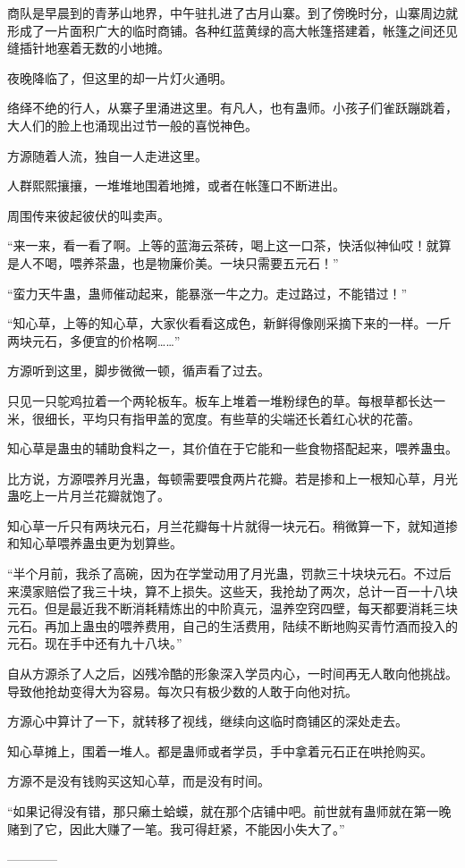 \begin{this_body}
商队是早晨到的青茅山地界，中午驻扎进了古月山寨。到了傍晚时分，山寨周边就形成了一片面积广大的临时商铺。各种红蓝黄绿的高大帐篷搭建着，帐篷之间还见缝插针地塞着无数的小地摊。

夜晚降临了，但这里的却一片灯火通明。

络绎不绝的行人，从寨子里涌进这里。有凡人，也有蛊师。小孩子们雀跃蹦跳着，大人们的脸上也涌现出过节一般的喜悦神色。

方源随着人流，独自一人走进这里。

人群熙熙攘攘，一堆堆地围着地摊，或者在帐篷口不断进出。

周围传来彼起彼伏的叫卖声。

“来一来，看一看了啊。上等的蓝海云茶砖，喝上这一口茶，快活似神仙哎！就算是人不喝，喂养茶蛊，也是物廉价美。一块只需要五元石！”

“蛮力天牛蛊，蛊师催动起来，能暴涨一牛之力。走过路过，不能错过！”

“知心草，上等的知心草，大家伙看看这成色，新鲜得像刚采摘下来的一样。一斤两块元石，多便宜的价格啊……”

方源听到这里，脚步微微一顿，循声看了过去。

只见一只鸵鸡拉着一个两轮板车。板车上堆着一堆粉绿色的草。每根草都长达一米，很细长，平均只有指甲盖的宽度。有些草的尖端还长着红心状的花蕾。

知心草是蛊虫的辅助食料之一，其价值在于它能和一些食物搭配起来，喂养蛊虫。

比方说，方源喂养月光蛊，每顿需要喂食两片花瓣。若是掺和上一根知心草，月光蛊吃上一片月兰花瓣就饱了。

知心草一斤只有两块元石，月兰花瓣每十片就得一块元石。稍微算一下，就知道掺和知心草喂养蛊虫更为划算些。

“半个月前，我杀了高碗，因为在学堂动用了月光蛊，罚款三十块块元石。不过后来漠家赔偿了我三十块，算不上损失。这些天，我抢劫了两次，总计一百一十八块元石。但是最近我不断消耗精炼出的中阶真元，温养空窍四壁，每天都要消耗三块元石。再加上蛊虫的喂养费用，自己的生活费用，陆续不断地购买青竹酒而投入的元石。现在手中还有九十八块。”

自从方源杀了人之后，凶残冷酷的形象深入学员内心，一时间再无人敢向他挑战。导致他抢劫变得大为容易。每次只有极少数的人敢于向他对抗。

方源心中算计了一下，就转移了视线，继续向这临时商铺区的深处走去。

知心草摊上，围着一堆人。都是蛊师或者学员，手中拿着元石正在哄抢购买。

方源不是没有钱购买这知心草，而是没有时间。

“如果记得没有错，那只癞土蛤蟆，就在那个店铺中吧。前世就有蛊师就在第一晚赌到了它，因此大赚了一笔。我可得赶紧，不能因小失大了。”

------------

\end{this_body}


